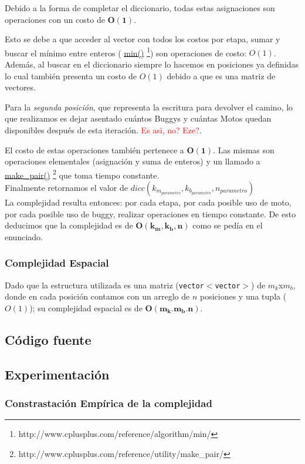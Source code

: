 Debido a la forma de completar el diccionario, todas estas asignaciones son operaciones con un costo de $\mathbf{O(1)}$. 

Esto se debe a que acceder al vector con todos los costos por etapa, sumar y buscar el m\'inimo entre enteros ( \href{http://www.cplusplus.com/reference/algorithm/min/}{min()} \footnote{http://www.cplusplus.com/reference/algorithm/min/}) son operaciones de costo: $O(1)$. Adem\'as, al buscar en el diccionario siempre lo hacemos en posiciones ya definidas lo cual tambi\'en presenta un costo de $O(1)$ debido a que es una matriz de vectores.\\

\newpage

Para la \emph{segunda posici\'on}, que representa la escritura para devolver el camino, lo que realizamos es dejar asentado cu\'antos Buggys y cu\'antas Motos quedan disponibles despu\'es de esta iteraci\'on. \textcolor{red}{Es asi, no? Eze?}.

El costo de estas operaciones tambi\'en pertenece a $\mathbf{O(1)}$. Las mismas son operaciones elementales (asignaci\'on y suma de enteros) y un llamado a  \href{http://www.cplusplus.com/reference/utility/make_pair/}{make\_pair()} \footnote{http://www.cplusplus.com/reference/utility/make_pair/} que toma tiempo constante.\\



Finalmente retornamos el valor de $dicc(k_{m_{parametro}},k_{b_{parametro}},n_{parametro})$\\

La complejidad resulta entonces: por cada etapa, por cada posible uso de moto, por cada posible uso de buggy, realizar operaciones en tiempo constante. De esto deducimos que la complejidad es de $\mathbf{O(k_{m},k_{b},n)}$ como se ped\'ia en el enunciado.

\subsubsection{Complejidad Espacial}
Dado que la estructura utilizada es una matriz (\texttt{vector$<$vector$>$}) de $m_k$x$m_b$, donde en cada posici\'on contamos con un arreglo de $n$ posiciones y una tupla ($O(1)$); su complejidad espacial es de $\mathbf{O(m_k.m_b.n)}$.

\newpage
\subsection{C\'odigo fuente}

\newpage
\subsection{Experimentaci\'on}

\subsubsection{Constrastaci\'on Emp\'irica de la complejidad}
